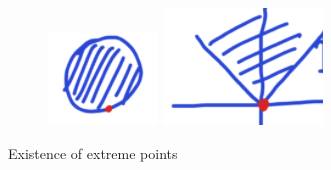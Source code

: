 \documentclass[11pt]{article}
\numberwithin{equation}{section}
\begin{document}
\begin{figure}[htb]
    \centering
    \begin{subfigure}[b]{\textwidth}
        \centering
        \includegraphics[width=0.2\linewidth]{images/4-ex-1.png}
        \includegraphics[width=0.2\linewidth]{images/4-ex-2.png}
    \end{subfigure}
    \caption{Existence of extreme points}
\end{figure}
\end{document}
